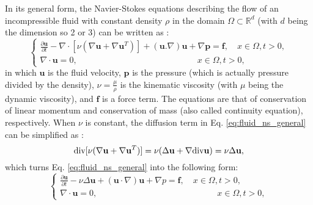 In its general form, the Navier-Stokes equations describing the flow of an incompressible fluid with constant density $\rho$ in the domain $\Omega \subset \mathbb{R}^{d}$ (with $d$ being the dimension so 2 or 3) can be written as \cite{Chung2014}:
\begin{equation} \label{eq:fluid_ns_general}
\left\{ {\begin{array}{*{20}{l}}
\displaystyle  {\frac{{\partial {\mathbf{u}}}}{{\partial t}} - {\nabla\cdot}[\nu(\nabla {\mathbf{u}} + \nabla {{\mathbf{u}}^T})] + ({\mathbf{u}}.\nabla ){\mathbf{u}} + \nabla {\mathbf{p}} = {\mathbf{f}},\quad x \in \Omega ,t > 0,} \\
\displaystyle  {\nabla\cdot{\mathbf{u}} = 0,\quad \quad \quad \quad \quad \quad \quad \quad \quad \quad \quad \quad \quad \quad x \in \Omega ,t > 0,}
\end{array}} \right.
\end{equation}
in which $\mathbf{u}$ is the fluid velocity, $\mathbf{p}$ is the pressure (which is actually pressure divided by the density), $\nu = \frac{\mu}{\rho}$ is the kinematic viscosity (with $\mu$ being the dynamic viscosity), and
$\mathbf{f}$ is a force term. The equations are that of conservation of linear momentum and conservation of mass (also called continuity equation), respectively. When $\nu$ is constant, the diffusion term in Eq. \ref{eq:fluid_ns_general} can be simplified as \cite{Quarteroni2014}:
\begin{equation}
\text{div} [\nu(\nabla {\bf u}+\nabla {\bf u}^{T})] =\nu (\Delta {\bf u} + \nabla \text{div} {\bf u})=\nu \Delta {\bf u},
\end{equation}
which turns Eq. \ref{eq:fluid_ns_general} into the following form:
\begin{equation}  \label{eq:fluid_ns}
\left\{ {\begin{array}{*{20}{l}}
\displaystyle  {\frac{{\partial {\mathbf{u}}}}{{\partial t}} - \nu\Delta{\mathbf{u}} + \left( {{\mathbf{u}} \cdot \nabla } \right) {\mathbf{u}} + \nabla p = {\mathbf{f}},\quad x \in \Omega ,t > 0,} \\
 \displaystyle {\nabla\cdot{\mathbf{u}} = 0,\quad \quad \quad \quad \quad \quad \quad \quad \quad \quad \quad \quad \quad \quad x \in \Omega ,t > 0,}
\end{array}} \right.
\end{equation}

